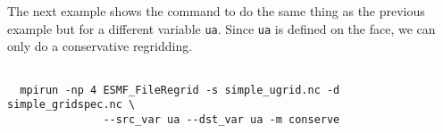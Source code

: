 The next example shows the command to do the same thing as the previous example but for a 
different variable {\tt ua}.  Since {\tt ua} is defined on the face, we can only do a conservative 
regridding.

\begin{verbatim}

  mpirun -np 4 ESMF_FileRegrid -s simple_ugrid.nc -d simple_gridspec.nc \
               --src_var ua --dst_var ua -m conserve

\end{verbatim}


